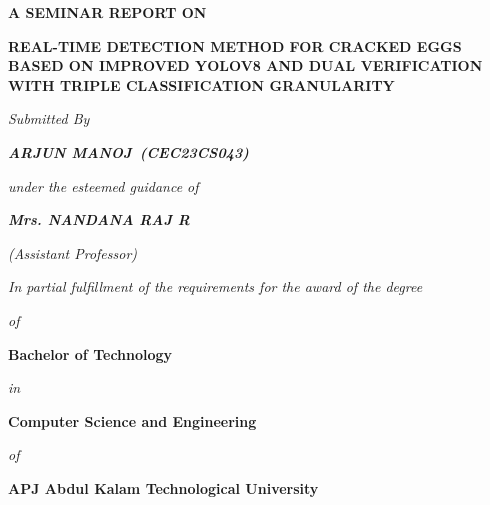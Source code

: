 \documentclass[12pt,a4paper]{report}
\newcommand{\studentname}{ARJUN MANOJ}
\newcommand{\rollno}{CEC23CS043}
\newcommand{\guidename}{Mrs. NANDANA RAJ R}
\begin{document}

\begin{titlepage}
\thispagestyle{empty}
\begin{center}

\vspace*{0.2cm}

{\Large\bfseries A SEMINAR REPORT ON}\par

\vspace{0.45cm}

{\fontsize{16}{20}\selectfont\bfseries
REAL-TIME DETECTION METHOD FOR CRACKED EGGS\\
BASED ON IMPROVED YOLOV8 AND DUAL VERIFICATION\\
WITH TRIPLE CLASSIFICATION GRANULARITY}\par

\vspace{0.55cm}

{\large\itshape Submitted By}\par
\vspace{0.2cm}
{\large\bfseries\itshape \studentname\ (\rollno)}\par

\vspace{0.4cm}

{\large\itshape under the esteemed guidance of}\par
\vspace{0.2cm}
{\large\bfseries\itshape \guidename}\par
\vspace{0.1cm}
{\large\itshape (Assistant Professor)}\par

\vspace{0.4cm}

{\large\itshape In partial fulfillment of the requirements for the award of the degree}\par
{\large\itshape of}\par
{\large\bfseries Bachelor of Technology}\par
{\large\itshape in}\par
{\large\bfseries Computer Science and Engineering}\par
{\large\itshape of}\par
{\large\bfseries APJ Abdul Kalam Technological University}\par


\end{center}
\end{titlepage}
\end{document}
